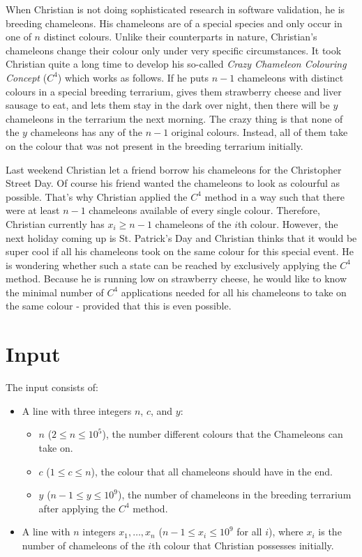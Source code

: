 
When Christian is not doing sophisticated research in software validation, he is breeding chameleons. His chameleons are of a special species and only occur in one of $n$ distinct colours. Unlike their counterparts in nature, Christian's chameleons change their colour only under very specific circumstances. It took Christian quite a long time to develop his so-called \textit{Crazy Chameleon Colouring Concept} ($C^4$) which works as follows. If he puts $n-1$ chameleons with distinct colours in a special breeding terrarium, gives them strawberry cheese and liver sausage to eat, and lets them stay in the dark over night, then there will be $y$ chameleons in the terrarium the next morning. The crazy thing is that none of the $y$ chameleons has any of the $n-1$ original colours. Instead, all of them take on the colour that was not present in the breeding terrarium initially.

Last weekend Christian let a friend borrow his chameleons for the Christopher Street Day. Of course his friend wanted the chameleons to look as colourful as possible. That's why Christian applied the $C^4$ method in a way such that there were at least $n-1$ chameleons available of every single colour. Therefore, Christian currently has $x_i \ge n-1$ chameleons of the $i$th colour. However, the next holiday coming up is St. Patrick's Day and Christian thinks that it would be super cool if all his chameleons took on the same colour for this special event. He is wondering whether such a state can be reached by exclusively applying the $C^4$ method. Because he is running low on strawberry cheese, he would like to know the minimal number of $C^4$ applications needed for all his chameleons to take on the same colour - provided that this is even possible.

\section*{Input}
The input consists of:
\begin{itemize}
	\item A line with three integers $n$, $c$, and $y$:
	\begin{itemize}
		\item $n$ ($2 \le n \le 10^5$), the number different colours that the Chameleons can take on.
		\item $c$ ($1 \le c \le n$), the colour that all chameleons should have in the end.
		\item $y$ ($n-1 \le y \le 10^9$), the number of chameleons in the breeding terrarium after applying the $C^4$ method.
	\end{itemize} 
	\item A line with $n$ integers $x_1,\ldots,x_n$ ($n-1 \le x_i \le 10^9$ for all $i$), where $x_i$ is the number of chameleons of the $i$th colour that Christian possesses initially.
\end{itemize}

